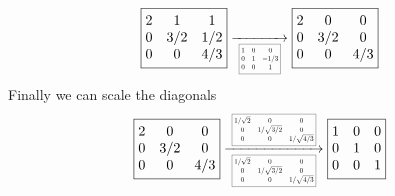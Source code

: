 \documentclass[12pt]{amsart}
\theoremstyle{definition}
\begin{document}
\begin{enumerate}
$$\boxed{\begin{matrix}
    2 & 1 & 1\\
    0 & 3/2 & 1/2\\
    0 & 0 & 4/3
\end{matrix}}
\xrightarrow[\scalebox{0.5}{\;
\boxed{\begin{matrix}
    1 & 0 & 0\\
    0 & 1 & -1/3\\
    0 & 0 & 1
\end{matrix}}\;}]{}
\boxed{\begin{matrix}
    2 & 0 & 0\\
    0 & 3/2 & 0\\
    0 & 0 & 4/3
\end{matrix}}$$
Finally we can scale the diagonals 
$$\boxed{\begin{matrix}
    2 & 0 & 0\\
    0 & 3/2 & 0\\
    0 & 0 & 4/3
\end{matrix}}
\xrightarrow[\scalebox{0.5}{\;
\boxed{\begin{matrix}
    1/\sqrt{2} & 0 & 0\\
    0 & 1/\sqrt{3/2} & 0\\
    0 & 0 & 1/\sqrt{4/3}
\end{matrix}}\;}]{\scalebox{0.5}{\;
\boxed{\begin{matrix}
    1/\sqrt{2} & 0 & 0\\
    0 & 1/\sqrt{3/2} & 0\\
    0 & 0 & 1/\sqrt{4/3}
\end{matrix}}\;}}
\boxed{\begin{matrix}
    1 & 0 & 0\\
    0 & 1 & 0\\
    0 & 0 & 1
\end{matrix}}
$$


\end{enumerate}
\end{document}
